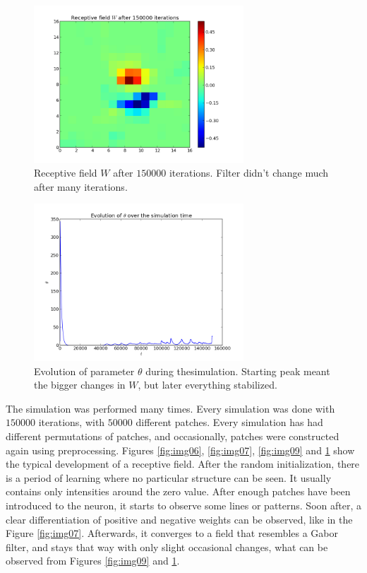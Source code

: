 \begin{figure}[h]
\centering
\includegraphics[width=0.7\textwidth]{../ex3/results1/img16}
\caption{Receptive field $W$ after $150000$ iterations. Filter didn't change
much after many iterations.}
\label{fig:img16}
\end{figure}

\begin{figure}[h]
\centering
\includegraphics[width=0.7\textwidth]{../ex3/results1/theta}
\caption{Evolution of parameter $\theta$ during thesimulation. Starting peak
meant the bigger changes in $W$, but later everything stabilized.}
\label{fig:theta}
\end{figure}

The simulation was performed many times. Every simulation was done with $150000$
iterations, with $50000$ different patches. Every simulation has had different
permutations of patches, and occasionally, patches were constructed again using
preprocessing. Figures \ref{fig:img06}, \ref{fig:img07}, \ref{fig:img09} and
\ref{fig:img16} show the typical development of a receptive field. After the
random initialization, there is a period of learning where no particular
structure can be seen. It usually contains only intensities around the zero
value. After enough patches have been introduced to the neuron, it starts to
observe some lines or patterns. Soon after, a clear differentiation of positive
and negative weights can be observed, like in the Figure \ref{fig:img07}.
Afterwards, it converges to a field that resembles a Gabor filter, and stays
that way with only slight occasional changes, what can be observed from Figures
\ref{fig:img09} and \ref{fig:img16}.

